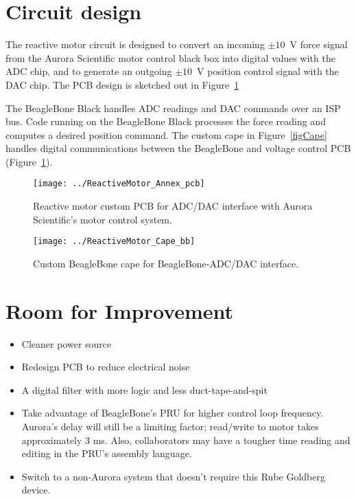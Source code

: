 \documentclass[11pt, letterpaper]{article}
\begin{document}
\section{Circuit design}
The reactive motor circuit is designed to convert an incoming $\pm10$~V force signal from the Aurora Scientific motor control black box into digital values with the ADC chip, and to generate an outgoing $\pm10$~V position control signal with the DAC chip. The PCB design is sketched out in Figure~\ref{figAnnex}

The BeagleBone Black handles ADC readings and DAC commands over an ISP bus. Code running on the BeagleBone Black processes the force reading and computes a desired position command. The custom cape in Figure~\ref{figCape} handles digital communications between the BeagleBone and voltage control PCB (Figure~\ref{figAnnex}).



\begin{figure}[!p]
	\centering
	\texttt{[image: ../ReactiveMotor\_Annex\_pcb]}
	\caption{Reactive motor custom PCB for ADC/DAC interface with Aurora Scientific's motor control system.}
	\label{figAnnex}
\end{figure}

\begin{figure}[!p]
\centering
\texttt{[image: ../ReactiveMotor\_Cape\_bb]}
\caption{Custom BeagleBone cape for BeagleBone-ADC/DAC interface.}
\end{figure}

\section{Room for Improvement}
\begin{itemize}
	\item Cleaner power source
	\item Redesign PCB to reduce electrical noise
	\item A digital filter with more logic and less duct-tape-and-spit
	\item Take advantage of BeagleBone's PRU for higher control loop frequency. Aurora's delay will still be a limiting factor; read/write to motor takes approximately 3 ms. Also, collaborators may have a tougher time reading and editing in the PRU's assembly language.
	\item Switch to a non-Aurora system that doesn't require this Rube Goldberg device.
\end{itemize}
	
\newpage
\end{document}
